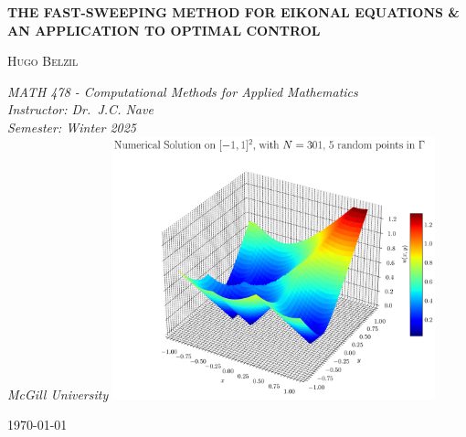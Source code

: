 \documentclass[11pt]{article}
\theoremstyle{definition}
\theoremstyle{remark}
\begin{document}
\begin{titlepage}
    \centering
    \vspace*{2cm}
    {\huge \bfseries THE FAST-SWEEPING METHOD FOR EIKONAL EQUATIONS \& AN APPLICATION
    TO OPTIMAL CONTROL \par}
    \vspace{1.5cm}
    {\Large \textsc{Hugo Belzil} \par}
    \vspace{0.4cm}
    \textit{MATH 478 - Computational Methods for Applied Mathematics} \\
    \textit{Instructor: Dr.~J.C. Nave} \\
    \textit{Semester: Winter 2025} \\
    \textit{McGill University}
    \vfill
    \vspace{0.8cm}
    \includegraphics[width=0.7\textwidth]{plots/solution_3d_surface_random5.png} %
    \vfill
    \vspace{0.8cm}
    {\large \today\par}
\end{titlepage}


\tableofcontents
\thispagestyle{empty}

\clearpage
\end{document}

